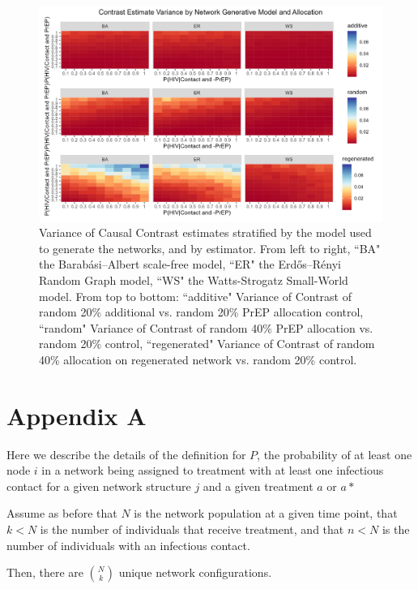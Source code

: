 \documentclass{article}
\theoremstyle{definition}
\begin{document}
\begin{figure}[H]
    \centering
    \includegraphics[scale=0.75]{Figures/Generative Model Variance plots.png}
    \caption{Variance of Causal Contrast estimates stratified by the model used to generate the networks, and by estimator. From left to right, ``BA" the Barabási–Albert scale-free model, ``ER" the Erdős–Rényi Random Graph model, ``WS" the Watts-Strogatz Small-World model. From top to bottom: ``additive" Variance of Contrast of random 20\% additional vs. random 20\% PrEP allocation control, ``random" Variance of Contrast of random 40\% PrEP allocation vs. random 20\% control, ``regenerated" Variance of Contrast of random 40\% allocation on regenerated network vs. random 20\% control.}
    \label{fig:Figure 24}
\end{figure}
\section{Appendix A}
Here we describe the details of the definition for $P$, the probability of at least one node $i$ in a network being assigned to treatment with at least one infectious contact for a given network structure $j$ and a given treatment $a$ or $a*$

Assume as before that $N$ is the network population at a given time point, that $k<N$ is the number of individuals that receive treatment, and that $n<N$ is the number of individuals with an infectious contact.

 Then, there are $\binom{N}{k}$ unique network configurations.
 
\end{document}
